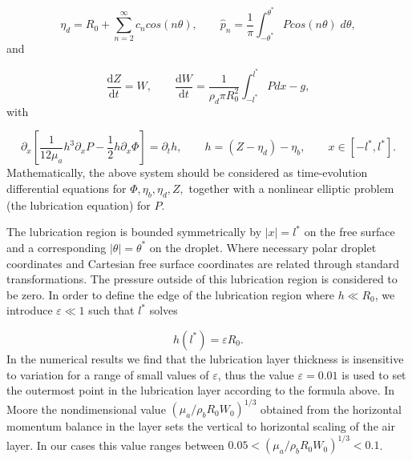    \begin{equation}
   \eta_d=  R_0+\sum_{n=2}^\infty c_n cos(n\theta), \qquad \hat{p}_n = \frac{1}{\pi}\int_{-\theta^*}^{\theta^*} P cos(n\theta) \; d\theta, 
   \end{equation}
   and
   
\begin{equation}
    \frac{\text{d}Z}{\text{d}t} = W,  \qquad  \frac{\text{d}W}{\text{d}t} = \frac{1}{\rho_d \pi R_0^2}\int_{-l^*}^{l^*} P dx - g, 
\end{equation}
with 

\begin{equation}\label{eq: Numeric LubricationEquation}
    \partial_x \left[\frac{1}{12\mu_a} h^3 \partial_x P  - \frac{1}{2} h \partial_x \Phi \right] = \partial_t h, \qquad h = \left(Z-\eta_d\right) - \eta_b, \qquad x \in [-l^*,l^*].
\end{equation}
Mathematically, the above system should be considered as time-evolution differential equations for $\Phi, \eta_b, \eta_d, Z,$ together with a nonlinear elliptic problem (the lubrication equation) for $P$.

The lubrication region is bounded symmetrically by $|x|=l^*$ on the free surface and a corresponding $|\theta|=\theta^*$ on the droplet. Where necessary polar droplet coordinates and Cartesian free surface coordinates are related through standard transformations. The pressure outside of this lubrication region is considered to be zero. In order to define the edge of the lubrication region where $h \ll R_0$, we introduce $\varepsilon \ll 1$ such that $l^*$ solves

\begin{equation}
h(l^*) = \varepsilon R_0.
\end{equation}
In the numerical results we find that the lubrication layer thickness is insensitive to variation for a range of small values of $\varepsilon$, thus the value $\varepsilon=0.01$ is used to set the outermost point in the lubrication layer according to the formula above. In Moore \cite{moore2021introducing} the nondimensional value $(\mu_a/\rho_b R_0 W_0)^{1/3}$ obtained from  the horizontal momentum balance in the layer sets the vertical to horizontal scaling of the air layer. In our cases this value ranges between $0.05 < (\mu_a/\rho_b R_0 W_0)^{1/3} < 0.1$.

